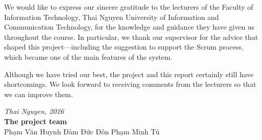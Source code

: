 \documentclass[../main.tex]{subfiles}
\begin{document}
We would like to express our sincere gratitude to the lecturers of the Faculty of Information
Technology, Thai Nguyen University of Information and Communication Technology, for the knowledge
and guidance they have given us throughout the course. In particular, we thank our supervisor for
the advice that shaped this project---including the suggestion to support the Scrum process, which
became one of the main features of the system.

Although we have tried our best, the project and this report certainly still have shortcomings. We
look forward to receiving comments from the lecturers so that we can improve them.

\vspace{1cm}
\begin{flushright}
\textit{Thai Nguyen, 2026}\\
\textbf{The project team}\\
Phạm Văn Huynh \quad Đàm Đức Đôn \quad Phạm Minh Tú
\end{flushright}
\end{document}
